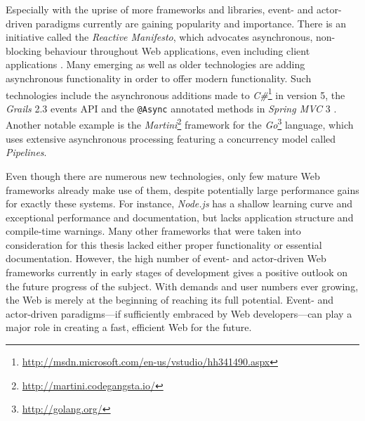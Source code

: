Especially with the uprise of more frameworks and libraries, event- and actor-driven paradigms currently are gaining popularity and importance. There is an initiative called the \textit{Reactive Manifesto}, which advocates asynchronous, non-blocking behaviour throughout Web applications, even including client applications \cite{reactive}. Many emerging as well as older technologies are adding asynchronous functionality in order to offer modern functionality. Such technologies include the asynchronous additions made to \textit{C\#}\footnote{\url{http://msdn.microsoft.com/en-us/vstudio/hh341490.aspx}} in version 5, the \textit{Grails} 2.3 events API and the \texttt{@Async} annotated methods in \textit{Spring MVC} 3 \cite{Syme1983} \cite{Ledbrook2013}. Another notable example is the \textit{Martini}\footnote{\url{http://martini.codegangsta.io/}} framework for the \textit{Go}\footnote{\url{http://golang.org/}} language, which uses extensive asynchronous processing featuring a concurrency model called \textit{Pipelines}.

Even though there are numerous new technologies, only few mature Web frameworks already make use of them, despite potentially large performance gains for exactly these systems. For instance, \textit{Node.js} has a shallow learning curve and exceptional performance and documentation, but lacks application structure and compile-time warnings. Many other frameworks that were taken into consideration for this thesis lacked either proper functionality or essential documentation. However, the high number of event- and actor-driven Web frameworks currently in early stages of development gives a positive outlook on the future progress of the subject. With demands and user numbers ever growing, the Web is merely at the beginning of reaching its full potential. Event- and actor-driven paradigms---if sufficiently embraced by Web developers---can play a major role in creating a fast, efficient Web for the future.